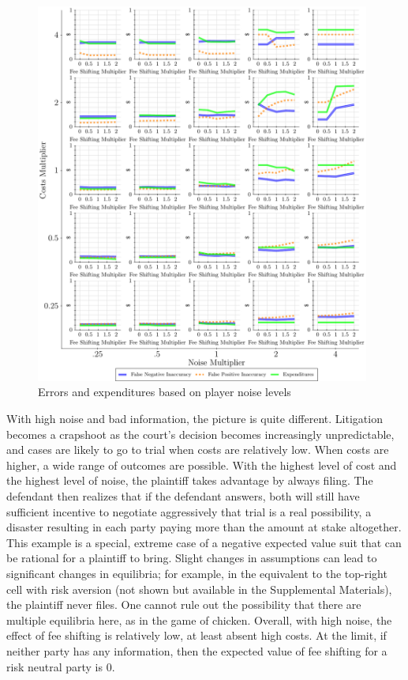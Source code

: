 \documentclass{article}
\begin{document}
\begin{figure}
\begin{minipage}{0.48\textwidth}
        \centering
        \includegraphics[width=0.98\textwidth, scale=0.70, trim={0in 0in 0in 0in}, clip]{../Figures/Accuracy and Expenditures Varying Noise Multiplier} %
        \caption{Errors and expenditures based on player noise levels}
		\label{fig:accexp_playernoise}
    \end{minipage}
\end{figure}

With high noise and bad information, the picture is quite different. Litigation becomes a crapshoot as the court's decision becomes increasingly unpredictable, and cases are likely to go to trial when costs are relatively low. When costs are higher, a wide range of outcomes are possible. With the highest level of cost and the highest level of noise, the plaintiff takes advantage by always filing. The defendant then realizes that if the defendant answers, both will still have sufficient incentive to negotiate aggressively that trial is a real possibility, a disaster resulting in each party paying more than the amount at stake altogether. This example is a special, extreme case of a negative expected value suit that can be rational for a plaintiff to bring. Slight changes in assumptions can lead to significant changes in equilibria; for example, in the equivalent to the top-right cell with risk aversion (not shown but available in the Supplemental Materials), the plaintiff never files. One cannot rule out the possibility that there are multiple equilibria here, as in the game of chicken. Overall, with high noise, the effect of fee shifting is relatively low, at least absent high costs. At the limit, if neither party has any information, then the expected value of fee shifting for a risk neutral party is 0.  
\end{document}
